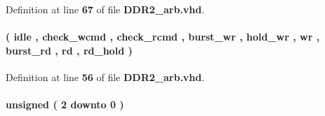 Definition at line {\bf 67} of file {\bf D\+D\+R2\+\_\+arb.\+vhd}.

\paragraph[{state\+\_\+type}]{ {\bfseries \textcolor{vhdlchar}{(}\textcolor{vhdlchar}{ }\textcolor{vhdlchar}{idle}\textcolor{vhdlchar}{ }\textcolor{vhdlchar}{,}\textcolor{vhdlchar}{ }\textcolor{vhdlchar}{check\+\_\+wcmd}\textcolor{vhdlchar}{ }\textcolor{vhdlchar}{,}\textcolor{vhdlchar}{ }\textcolor{vhdlchar}{check\+\_\+rcmd}\textcolor{vhdlchar}{ }\textcolor{vhdlchar}{,}\textcolor{vhdlchar}{ }\textcolor{vhdlchar}{burst\+\_\+wr}\textcolor{vhdlchar}{ }\textcolor{vhdlchar}{,}\textcolor{vhdlchar}{ }\textcolor{vhdlchar}{hold\+\_\+wr}\textcolor{vhdlchar}{ }\textcolor{vhdlchar}{,}\textcolor{vhdlchar}{ }\textcolor{vhdlchar}{wr}\textcolor{vhdlchar}{ }\textcolor{vhdlchar}{,}\textcolor{vhdlchar}{ }\textcolor{vhdlchar}{burst\+\_\+rd}\textcolor{vhdlchar}{ }\textcolor{vhdlchar}{,}\textcolor{vhdlchar}{ }\textcolor{vhdlchar}{rd}\textcolor{vhdlchar}{ }\textcolor{vhdlchar}{,}\textcolor{vhdlchar}{ }\textcolor{vhdlchar}{rd\+\_\+hold}\textcolor{vhdlchar}{ }\textcolor{vhdlchar}{)}\textcolor{vhdlchar}{ }} \hspace{0.3cm}{\ttfamily [Type]}}\label{classDDR2__arb_1_1arch_a8ed97967832ee4b1ce650ea3aae12e92}


Definition at line {\bf 56} of file {\bf D\+D\+R2\+\_\+arb.\+vhd}.

\paragraph[{wr\+\_\+cnt}]{ {\bfseries \textcolor{comment}{unsigned}\textcolor{vhdlchar}{ }\textcolor{vhdlchar}{(}\textcolor{vhdlchar}{ }\textcolor{vhdlchar}{ } \textcolor{vhdldigit}{2} \textcolor{vhdlchar}{ }\textcolor{keywordflow}{downto}\textcolor{vhdlchar}{ }\textcolor{vhdlchar}{ } \textcolor{vhdldigit}{0} \textcolor{vhdlchar}{ }\textcolor{vhdlchar}{)}\textcolor{vhdlchar}{ }} \hspace{0.3cm}{\ttfamily [Signal]}}\label{classDDR2__arb_1_1arch_aa258e6ca26dfabaf42c5c6bdca094421}


